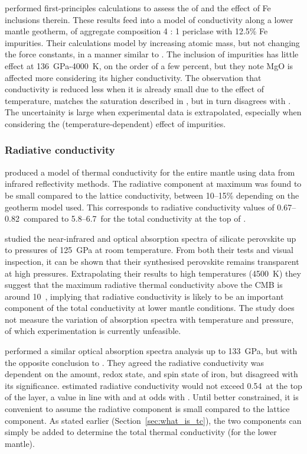 \citet{Tang2014} performed first-principles calculations to assess the \tcs of \mgsios
and the effect of Fe inclusions therein. These results feed into a model of conductivity along a lower mantle geotherm, of aggregate composition 4 \bdg : 1 periclase with 12.5\% Fe impurities. Their calculations model \mgfesios by increasing atomic mass, but not changing the force constants, in a manner similar to \citet{Ammann2014}. The inclusion of impurities has little effect at 136~GPa-4000~K, on the order of a few percent, but they note MgO is affected more considering its higher conductivity. The observation that conductivity is reduced less when it is already small due to the effect of temperature, matches the saturation described in \citet{Ammann2014}, but in turn disagrees with \citet{Haigis2012}. The uncertainity is large when experimental data is extrapolated, especially when considering the (temperature-dependent) effect of impurities.

\subsubsection{Radiative conductivity}
\label{sec:rad_cond}

\citet{Hofmeister1999} produced a model of thermal conductivity for the entire mantle using data from infrared reflectivity methods. The radiative component at maximum was found to be small compared to the lattice conductivity, between 10--15\% depending on the geotherm model used. This corresponds to radiative conductivity values of 0.67--0.82~\wmks compared to 5.8--6.7~\wmks for the total conductivity at the top of \ddd.

\citet{Keppler2008} studied the near-infrared and optical absorption spectra of silicate perovskite up to pressures of 125~GPa at room temperature. From both their tests and visual inspection, it can be shown that their synthesised perovskite remains transparent at high pressures. Extrapolating their results to high temperatures (4500~K) they suggest that the maximum radiative thermal conductivity above the CMB is around 10~\wmk, implying that radiative conductivity is likely to be an important component of the total conductivity at lower mantle conditions. The study does not measure the variation of absorption spectra with temperature and pressure, of which experimentation is currently unfeasible.

\citet{Goncharov2008} performed a similar optical absorption spectra analysis up to 133~GPa, but with the opposite conclusion to \citet{Keppler2008}. They agreed the radiative conductivity was dependent on the amount, redox state, and spin state of iron, but disagreed with its significance. \citet{Goncharov2008} estimated radiative conductivity would not exceed 0.54~\wmks at the top of the \ddds layer, a value in line with \citet{Hofmeister1999} and at odds with \citet{Keppler2008}. Until better constrained, it is convenient to assume the radiative component is small compared to the lattice component. As stated earlier (Section~\ref{sec:what_is_tc}), the two components can simply be added to determine the total thermal conductivity (for the lower mantle).

